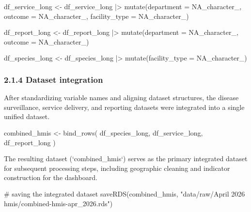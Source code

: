 \documentclass[
  letterpaper,
  DIV=11,
  numbers=noendperiod]{scrartcl}
\newenvironment{Shaded}{\begin{snugshade}}{\end{snugshade}}
\newcommand{\AttributeTok}[1]{\textcolor[rgb]{0.40,0.45,0.13}{#1}}
\newcommand{\CommentTok}[1]{\textcolor[rgb]{0.37,0.37,0.37}{#1}}
\newcommand{\ConstantTok}[1]{\textcolor[rgb]{0.56,0.35,0.01}{#1}}
\newcommand{\FunctionTok}[1]{\textcolor[rgb]{0.28,0.35,0.67}{#1}}
\newcommand{\NormalTok}[1]{\textcolor[rgb]{0.00,0.23,0.31}{#1}}
\newcommand{\OtherTok}[1]{\textcolor[rgb]{0.00,0.23,0.31}{#1}}
\newcommand{\SpecialCharTok}[1]{\textcolor[rgb]{0.37,0.37,0.37}{#1}}
\newcommand{\StringTok}[1]{\textcolor[rgb]{0.13,0.47,0.30}{#1}}
\begin{document}
\begin{Shaded}
\begin{Highlighting}[]
\NormalTok{df\_service\_long }\OtherTok{\textless{}{-}}\NormalTok{ df\_service\_long }\SpecialCharTok{|\textgreater{}}
  \FunctionTok{mutate}\NormalTok{(}\AttributeTok{department =} \ConstantTok{NA\_character\_}\NormalTok{,}
         \AttributeTok{outcome =} \ConstantTok{NA\_character\_}\NormalTok{,}
         \AttributeTok{facility\_type =} \ConstantTok{NA\_character\_}\NormalTok{)}

\NormalTok{df\_report\_long }\OtherTok{\textless{}{-}}\NormalTok{ df\_report\_long }\SpecialCharTok{|\textgreater{}}
  \FunctionTok{mutate}\NormalTok{(}\AttributeTok{department =} \ConstantTok{NA\_character\_}\NormalTok{,}
         \AttributeTok{outcome =} \ConstantTok{NA\_character\_}\NormalTok{)}

\NormalTok{df\_species\_long }\OtherTok{\textless{}{-}}\NormalTok{ df\_species\_long }\SpecialCharTok{|\textgreater{}}
  \FunctionTok{mutate}\NormalTok{(}\AttributeTok{facility\_type =} \ConstantTok{NA\_character\_}\NormalTok{)}
\end{Highlighting}
\end{Shaded}

\subsubsection{2.1.4 Dataset integration}\label{dataset-integration}

After standardizing variable names and aligning dataset structures, the
disease surveillance, service delivery, and reporting datasets were
integrated into a single unified dataset.

\begin{Shaded}
\begin{Highlighting}[]
\NormalTok{combined\_hmis }\OtherTok{\textless{}{-}} \FunctionTok{bind\_rows}\NormalTok{(}
\NormalTok{  df\_species\_long,}
\NormalTok{  df\_service\_long,}
\NormalTok{  df\_report\_long}
\NormalTok{)}
\end{Highlighting}
\end{Shaded}

The resulting dataset (`combined\_hmis`) serves as the primary
integrated dataset for subsequent processing steps, including geographic
cleaning and indicator construction for the dashboard.

\begin{Shaded}
\begin{Highlighting}[]
\CommentTok{\# saving the integrated dataset}
\FunctionTok{saveRDS}\NormalTok{(combined\_hmis,}
        \StringTok{"data/raw/April 2026 hmis/combined{-}hmis{-}apr\_2026.rds"}\NormalTok{)}
\end{Highlighting}
\end{Shaded}
\end{document}
